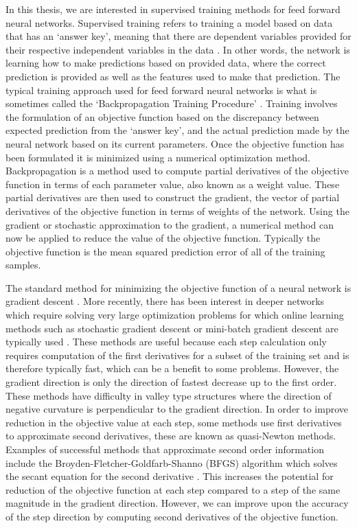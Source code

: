 \documentclass[letterpaper,12pt,titlepage,oneside,final]{book}
\begin{document}
	In this thesis, we are interested in supervised training methods for feed forward neural networks. Supervised training refers to training a model based on data that has an `answer key', meaning that there are dependent variables provided for their respective independent variables in the data \cite{hastie2009overview}. In other words, the network is learning how to make predictions based on provided data, where the correct prediction is provided as well as the features used to make that prediction. The typical training approach used for feed forward neural networks is what is sometimes called the `Backpropagation Training Procedure' \cite{priddy2005artificial}. Training involves the formulation of an objective function based on the discrepancy between expected prediction from the `answer key', and the actual prediction made by the neural network based on its current parameters. Once the objective function has been formulated it is minimized using a numerical optimization method. Backpropagation is a method used to compute partial derivatives of the objective function in terms of each parameter value, also known as a weight value. These partial derivatives are then used to construct the gradient, the vector of partial derivatives of the objective function in terms of weights of the network. Using the gradient or stochastic approximation to the gradient, a numerical method can now be applied to reduce the value of the objective function. Typically the objective function is the mean squared prediction error of all of the training samples. 
	
	The standard method for minimizing the objective function of a neural network is gradient descent  \cite{neural1}\cite{neural2}. More recently, there has been interest in deeper networks which require solving very large optimization problems for which online learning methods such as stochastic gradient descent or mini-batch gradient descent are typically used \cite{gulcehre2017robust}\cite{simpson2015oddball}. These methods are useful because each step calculation only requires computation of the first derivatives for a subset of the training set and is therefore typically fast, which can be a benefit to some problems. However, the gradient direction is only the direction of fastest decrease up to the first order. These methods have difficulty in valley type structures where the direction of negative curvature is perpendicular to the gradient direction. In order to improve reduction in the objective value at each step, some methods use first derivatives to approximate second derivatives, these are known as quasi-Newton methods. Examples of successful methods that approximate second order information include the Broyden-Fletcher-Goldfarb-Shanno (BFGS) algorithm which solves the secant equation for the second derivative \cite{Shepherd.1997}. This increases the potential for reduction of the objective function at each step compared to a step of the same magnitude in the gradient direction. However, we can improve upon the accuracy of the step direction by computing second derivatives of the objective function.
	
\end{document}
